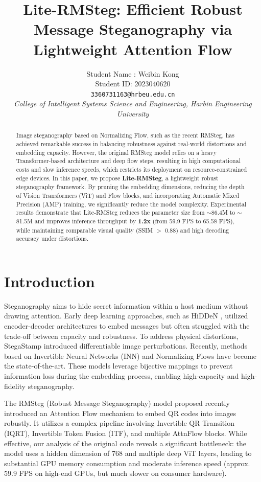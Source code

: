 \documentclass[10pt,twocolumn,letterpaper]{article}
\title{Lite-RMSteg: Efficient Robust Message Steganography via Lightweight Attention Flow}
\author{
    Student Name : Weibin Kong \\
    Student ID: 2023040620 \\
    {\tt\small 3360731163@hrbeu.edu.cn}
    \vspace{0.5cm} \\ 
    \textit{College of Intelligent Systems Science and Engineering, Harbin Engineering University}
}
\begin{document}
\maketitle

\begin{abstract}
Image steganography based on Normalizing Flow, such as the recent RMSteg, has achieved remarkable success in balancing robustness against real-world distortions and embedding capacity. However, the original RMSteg model relies on a heavy Transformer-based architecture and deep flow steps, resulting in high computational costs and slow inference speeds, which restricts its deployment on resource-constrained edge devices. In this paper, we propose \textbf{Lite-RMSteg}, a lightweight robust steganography framework. By pruning the embedding dimensions, reducing the depth of Vision Transformers (ViT) and Flow blocks, and incorporating Automatic Mixed Precision (AMP) training, we significantly reduce the model complexity. Experimental results demonstrate that Lite-RMSteg reduces the parameter size from $\sim$86.4M to $\sim$81.5M and improves inference throughput by \textbf{1.2x} (from 59.9 FPS to 65.58 FPS), while maintaining comparable visual quality (SSIM $>$ 0.88) and high decoding accuracy under distortions.
\end{abstract}

\section{Introduction}
\label{sec:intro}

Steganography aims to hide secret information within a host medium without drawing attention. Early deep learning approaches, such as HiDDeN \cite{hidden}, utilized encoder-decoder architectures to embed messages but often struggled with the trade-off between capacity and robustness. To address physical distortions, StegaStamp \cite{stegastamp} introduced differentiable image perturbations. Recently, methods based on Invertible Neural Networks (INN) \cite{isn, hinet} and Normalizing Flows \cite{realnvp, glow} have become the state-of-the-art. These models leverage bijective mappings to prevent information loss during the embedding process, enabling high-capacity and high-fidelity steganography.

The RMSteg (Robust Message Steganography) model \cite{rmsteg} proposed recently introduced an Attention Flow mechanism to embed QR codes into images robustly. It utilizes a complex pipeline involving Invertible QR Transition (IQRT), Invertible Token Fusion (ITF), and multiple AttnFlow blocks. While effective, our analysis of the original code reveals a significant bottleneck: the model uses a hidden dimension of 768 and multiple deep ViT layers, leading to substantial GPU memory consumption and moderate inference speed (approx. 59.9 FPS on high-end GPUs, but much slower on consumer hardware).
\end{document}
